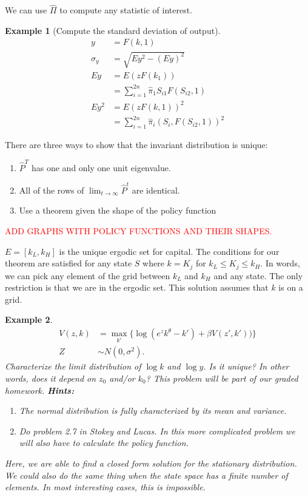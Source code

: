 \documentclass[11pt]{article}
\newtheorem*{example}{Example}
\newcommand{\rd}{\textcolor{red}}
\begin{document}
We can use \(\hat{\Pi}\) to compute any statistic of interest.
\begin{example}[Compute the standard deviation of output]
\begin{align*}
y &= F(k, 1)\\
\sigma_y &= \sqrt{Ey^2 - (Ey)^2}\\
Ey &= E (z F(k_1))\\ &= \sum^{2n}_{i = 1} \hat{\pi}_1 S_{i1}F(S_{i2}, 1)\\
Ey^2 &= E(zF(k, 1))^2\\ &= \sum^{2n}_{i = 1} \hat{\pi}_i (S_i, F(S_{i2}, 1))^2
\end{align*}
\end{example}
There are three ways to show that the invariant distribution is unique:
\begin{enumerate}
\item $\hat{P}^T$ has one and only one unit eigenvalue.
\item All of the rows of $\lim_{t \to \infty} \hat{P}^t$ are identical.
\item Use a theorem given the shape of the policy function
\end{enumerate}
\rd{ADD GRAPHS WITH POLICY FUNCTIONS AND THEIR SHAPES.}


\(E = [k_L, k_H]\) is the unique ergodic set for capital. The conditions for our theorem are satisfied for any state \(S\) where \(k = K_j\) for \(k_L \le K_j \le k_H\). In words, we can pick any element of the grid between \(k_L\) and \(k_H\) and any state. The only restriction is that we are in the ergodic set.  This solution assumes that \(k\) is on a grid.
\begin{example}
\begin{align*}
V(z, k) &= \max_{k'}\{\log(e^z k^\theta - k') + \beta V(z', k'))\}\\
Z &\sim N(0, \sigma^2).
\end{align*}
Characterize the limit distribution of $\log k$ and $\log y$. Is it unique? In other words, does it depend on $z_0$ and/or $k_0$? This problem will be part of our graded homework. \textbf{Hints:}
\begin{enumerate}
\item The normal distribution is fully characterized by its mean and variance.
\item Do problem 2.7 in Stokey and Lucas. In this more complicated problem we will also have to calculate the policy function.
\end{enumerate}
Here, we are able to find a closed form solution for the stationary distribution. We could also do the same thing when the state space has a finite number of elements. In most interesting cases, this is impossible.
\end{example}
\end{document}
